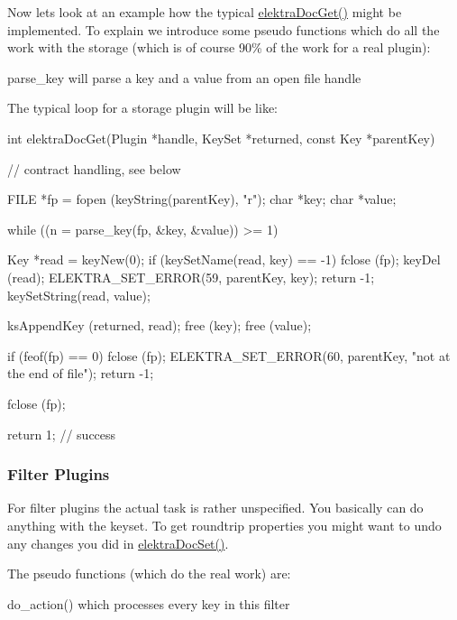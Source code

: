 Now lets look at an example how the typical \hyperlink{group__plugin_gacb69f3441c6d84241b4362f958fbe313}{elektraDocGet()} might be implemented. To explain we introduce some pseudo functions which do all the work with the storage (which is of course 90\% of the work for a real plugin):
\begin{DoxyItemize}
\item parse\_\-key will parse a key and a value from an open file handle
\end{DoxyItemize}

The typical loop for a storage plugin will be like: 
\begin{DoxyCode}
int elektraDocGet(Plugin *handle, KeySet *returned, const Key *parentKey)
{
        // contract handling, see below

        FILE *fp = fopen (keyString(parentKey), "r");
        char *key;
        char *value;

        while ((n = parse_key(fp, &key, &value)) >= 1)
        {
                Key *read = keyNew(0);
                if (keySetName(read, key) == -1)
                {
                        fclose (fp);
                        keyDel (read);
                        ELEKTRA_SET_ERROR(59, parentKey, key);
                        return -1;
                }
                keySetString(read, value);

                ksAppendKey (returned, read);
                free (key);
                free (value);
        }

        if (feof(fp) == 0)
        {
                fclose (fp);
                ELEKTRA_SET_ERROR(60, parentKey, "not at the end of file");
                return -1;
        }

        fclose (fp);

        return 1; // success
}
\end{DoxyCode}
\hypertarget{group__plugin_filter}{}\subsubsection{Filter Plugins}\label{group__plugin_filter}
For filter plugins the actual task is rather unspecified. You basically can do anything with the keyset. To get roundtrip properties you might want to undo any changes you did in \hyperlink{group__plugin_gae65781a1deb34efc79c8cb9d9174842c}{elektraDocSet()}.

The pseudo functions (which do the real work) are:
\begin{DoxyItemize}
\item do\_\-action() which processes every key in this filter
\end{DoxyItemize}


